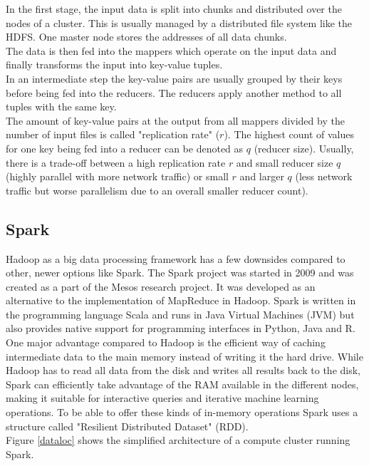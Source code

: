 \noindent In the first stage, the input data is split into chunks and distributed over the nodes of a cluster. This is usually managed by a distributed file system like the HDFS. One master node stores the addresses of all data chunks.\\
The data is then fed into the mappers which operate on the input data and finally transforms the input into key-value tuples.\\
In an intermediate step the key-value pairs are usually grouped by their keys before being fed into the reducers. The reducers apply another method to all tuples with the same key.\\
The amount of key-value pairs at the output from all mappers divided by the number of input files is called "replication rate" ($r$). The highest count of values for one key being fed into a reducer can be denoted as $q$ (reducer size). Usually, there is a trade-off between a high replication rate $r$ and small reducer size $q$ (highly parallel with more network traffic) or small $r$ and larger $q$ (less network traffic but worse parallelism due to an overall smaller reducer count).

\subsection{Spark}\label{sparksec}

Hadoop as a big data processing framework has a few downsides compared to other, newer options like Spark. The Spark project was started in 2009 and was created as a part of the Mesos research project. It was developed as an alternative to the implementation of MapReduce in Hadoop. Spark is written in the programming language Scala and runs in Java Virtual Machines (JVM) but also provides native support for programming interfaces in Python, Java and R. One major advantage compared to Hadoop is the efficient way of caching intermediate data to the main memory instead of writing it the hard drive. While Hadoop has to read all data from the disk and writes all results back to the disk, Spark can efficiently take advantage of the RAM available in the different nodes, making it suitable for interactive queries and iterative machine learning operations. To be able to offer these kinds of in-memory operations Spark uses a structure called "Resilient Distributed Dataset" (RDD). \cite[p. 13]{sparkbook1}\\ 
Figure \ref{dataloc} shows the simplified architecture of a compute cluster running Spark. 

